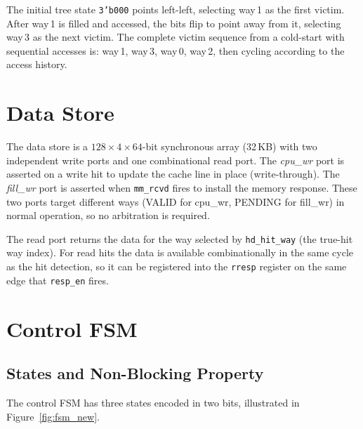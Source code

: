 \documentclass[12pt,letterpaper]{report}
\begin{document}
The initial tree state \texttt{3'b000} points left-left, selecting
way\,1 as the first victim.  After way\,1 is filled and accessed,
the bits flip to point away from it, selecting way\,3 as the next
victim.  The complete victim sequence from a cold-start with
sequential accesses is: way\,1, way\,3, way\,0, way\,2, then cycling
according to the access history.

\section{Data Store}

The data store is a $128 \times 4 \times 64$-bit synchronous array
(32\,KB) with two independent write ports and one combinational read
port.  The \emph{cpu\_wr} port is asserted on a write hit to update
the cache line in place (write-through).  The \emph{fill\_wr} port is
asserted when \texttt{mm\_rcvd} fires to install the memory response.
These two ports target different ways (VALID for cpu\_wr, PENDING for
fill\_wr) in normal operation, so no arbitration is required.

The read port returns the data for the way selected by
\texttt{hd\_hit\_way} (the true-hit way index).  For read hits the
data is available combinationally in the same cycle as the hit
detection, so it can be registered into the \texttt{rresp} register
on the same edge that \texttt{resp\_en} fires.

\section{Control FSM}
\label{sec:fsm}

\subsection{States and Non-Blocking Property}

The control FSM has three states encoded in two bits, illustrated in
Figure~\ref{fig:fsm_new}.
\end{document}
